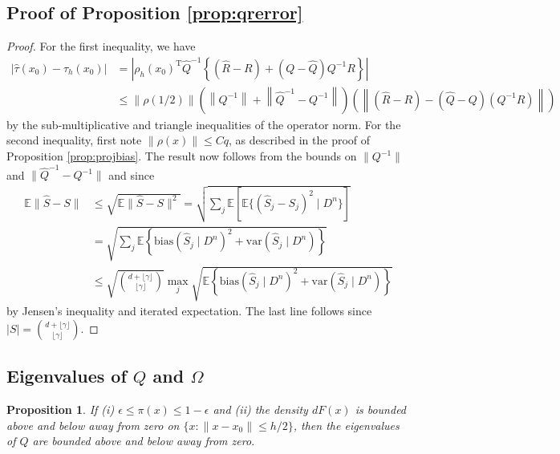 \documentclass[11pt,twoside]{article}
\def\T{{ \mathrm{\scriptscriptstyle T} }}
\newcommand{\var}{\text{var}}
\newcommand{\E}{\mathbb{E}}
\newcommand{\bias}{\text{bias}}
\newtheorem{propositionapp}{Proposition}
\theoremstyle{definition}
\theoremstyle{remark}
\begin{document}
\subsection{Proof of Proposition \ref{prop:qrerror}}

\begin{proof}
For the first inequality, we have
\begin{align*}
| \widehat\tau(x_0) - \tau_h(x_0) | %
&= \left| \rho_h(x_0)^\T \widehat{Q}^{-1} \left\{  \left( \widehat{R} - R \right) +    \left( Q - \widehat{Q} \right) Q^{-1} R \right\} \right| \\
&\leq \|\rho(1/2) \| \left( \left\| Q^{-1} \right\|+ \left\| \widehat{Q}^{-1} - Q^{-1} \right\| \right)\left( \left\| ( \widehat{R} - R) - (  \widehat{Q} - Q ) ( Q^{-1} R ) \right\| \right)
\end{align*}
by the sub-multiplicative and triangle inequalities of the operator norm. For the second inequality, first note $\| \rho(x)\| \leq Cq$, as described in the proof of Proposition \ref{prop:projbias}.  The result now  follows  from the bounds on $\| Q^{-1} \|$ and $ \| \widehat{Q}^{-1} - {Q}^{-1} \|$ and since
\begin{align*}
\E\| \widehat{S} - S  \|  &\leq \sqrt{ \E\| \widehat{S} - S  \|^2 } %
= \sqrt{ \sum_j \E\left[ \E\Big\{ (\widehat{S}_j - S_j)^2 \mid D^n \Big\} \right] } \\
&= \sqrt{ \sum_j \E\left\{ \bias(\widehat{S}_j \mid D^n)^2 + \var(\widehat{S}_j \mid D^n) \right\} } \\
&\leq \sqrt{ {{ d + \lfloor \gamma \rfloor } \choose { \lfloor\gamma \rfloor }} } \max_j \sqrt{ \E\left\{ \bias(\widehat{S}_j \mid D^n)^2 + \var(\widehat{S}_j \mid D^n) \right\} } 
\end{align*}
by Jensen's inequality and iterated expectation. The last line follows since $|S|={{ d + \lfloor \gamma \rfloor } \choose { \lfloor\gamma \rfloor }}$. 
\end{proof}

\bigskip

\subsection{Eigenvalues of $Q$ and $\Omega$}


\begin{propositionapp} \label{prop:qeigen}
If (i) $\epsilon \leq \pi(x) \leq 1-\epsilon$ and (ii) the density $dF(x)$ is bounded above and below away from zero on $\{x: \|x-x_0 \| \leq h/2\}$, then the eigenvalues of $Q$ are bounded above and below away from zero. 
\end{propositionapp}
\end{document}
